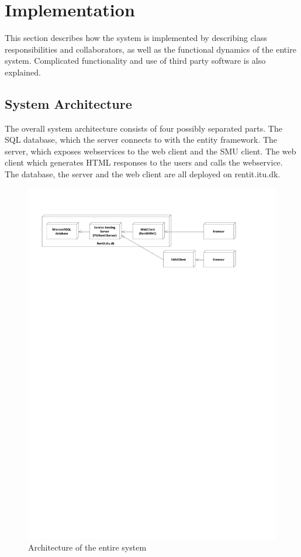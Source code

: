\documentclass[a4paper,11pt,report]{article}
\begin{document}
{\section{Implementation}
This section describes how the system is implemented by describing class responsibilities and collaborators, as well as the functional dynamics of the entire system. Complicated functionality and use of third party software is also explained.

\subsection{System Architecture}
The overall system architecture consists of four possibly separated parts. The SQL database, which the server connects to with the entity framework. The server, which exposes webservices to the web client and the SMU client. The web client which generates HTML responses to the users and calls the webservice. The database, the server and the web client are all deployed on rentit.itu.dk.

\begin{figure}[H]
  \centering
\includegraphics[keepaspectratio=true,trim=60pt 650pt 60pt 50pt]{./overallArchitecture.pdf}
\caption{Architecture of the entire system}
\end{figure}

}
\end{document}
